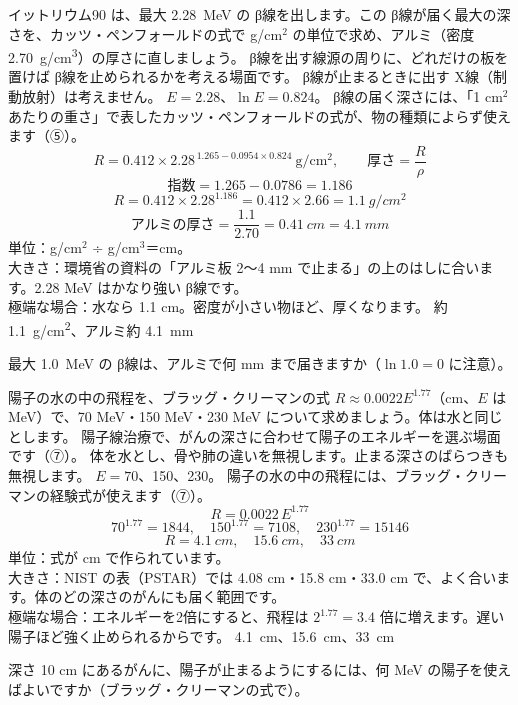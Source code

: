 \label{ph:原-13:ex8}
\begin{phreidai}
イットリウム90 は、最大 \qty{2.28}{MeV} の β線を出します。この β線が届く最大の深さを、カッツ・ペンフォールドの式で g/cm$^2$ の単位で求め、アルミ（密度 \qty{2.70}{g/cm^3}）の厚さに直しましょう。
\phbamen
β線を出す線源の周りに、どれだけの板を置けば β線を止められるかを考える場面です。
\phmushi
β線が止まるときに出す X線（制動放射）は考えません。
\phzu
$E=2.28$、$\ln E=0.824$。
\phriyu
β線の届く深さには、「1 cm$^2$ あたりの重さ」で表したカッツ・ペンフォールドの式が、物の種類によらず使えます（⑤）。
\phtateru
\[ R=0.412\times2.28^{\,1.265-0.0954\times0.824}\ \text{g/cm$^2$},\qquad \text{厚さ}=\frac{R}{\rho} \]
\phtoku
\[ \text{指数}=1.265-0.0786=1.186 \]
\[ R=0.412\times2.28^{1.186}=0.412\times2.66=\qty{1.1}{g/cm^2} \]
\[ \text{アルミの厚さ}=\frac{1.1}{2.70}=\qty{0.41}{cm}=\qty{4.1}{mm} \]
\phtashikame
単位：g/cm$^2$ ÷ g/cm$^3$＝cm。\\
大きさ：環境省の資料の「アルミ板 2〜4 mm で止まる」の上のはしに合います。2.28 MeV はかなり強い β線です。\\
極端な場合：水なら 1.1 cm。密度が小さい物ほど、厚くなります。
\kotae 約 \qty{1.1}{g/cm^2}、アルミ約 \qty{4.1}{mm}
\end{phreidai}
\begin{jibun}
最大 \qty{1.0}{MeV} の β線は、アルミで何 mm まで届きますか（$\ln1.0=0$ に注意）。
\end{jibun}

\label{ph:原-13:ex9}
\begin{phreidai}
陽子の水の中の飛程を、ブラッグ・クリーマンの式 $R\approx0.0022E^{1.77}$（cm、$E$ は MeV）で、70 MeV・150 MeV・230 MeV について求めましょう。体は水と同じとします。
\phbamen
陽子線治療で、がんの深さに合わせて陽子のエネルギーを選ぶ場面です（⑦）。
\phmushi
体を水とし、骨や肺の違いを無視します。止まる深さのばらつきも無視します。
\phzu
$E=70$、150、230。
\phriyu
陽子の水の中の飛程には、ブラッグ・クリーマンの経験式が使えます（⑦）。
\phtateru
\[ R=0.0022\,E^{1.77} \]
\phtoku
\[ 70^{1.77}=\num{1844},\quad 150^{1.77}=\num{7108},\quad 230^{1.77}=\num{15146} \]
\[ R=\qty{4.1}{cm},\quad \qty{15.6}{cm},\quad \qty{33}{cm} \]
\phtashikame
単位：式が cm で作られています。\\
大きさ：NIST の表（PSTAR）では 4.08 cm・15.8 cm・33.0 cm で、よく合います。体のどの深さのがんにも届く範囲です。\\
極端な場合：エネルギーを2倍にすると、飛程は $2^{1.77}=3.4$ 倍に増えます。遅い陽子ほど強く止められるからです。
\kotae \qty{4.1}{cm}、\qty{15.6}{cm}、\qty{33}{cm}
\end{phreidai}
\begin{jibun}
深さ 10 cm にあるがんに、陽子が止まるようにするには、何 MeV の陽子を使えばよいですか（ブラッグ・クリーマンの式で）。
\end{jibun}

